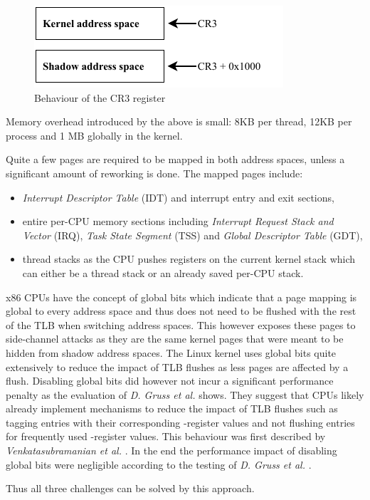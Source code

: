 \begin{figure}[h]
  \begin{center}
    \includegraphics[page=1,width=.35\textwidth]{fig/prebuilt_cr3-register}
  \end{center}
  \caption{Behaviour of the CR3 register}
  \label{fig:cr3-register}
\end{figure}

Memory overhead introduced by the above is small: 8KB per thread, 12KB per process and 1 MB globally in the kernel.\cite{kaiser}

Quite a few pages are required to be mapped in both address spaces, unless a significant amount of reworking is done.
The mapped pages include:

\begin{itemize}
  \item{\textit{Interrupt Descriptor Table} (IDT) and interrupt entry and exit  sections,}
  \item{entire per-CPU memory sections including \textit{Interrupt Request Stack and Vector} (IRQ), \textit{Task State Segment} (TSS) and \textit{Global Descriptor Table} (GDT),}
  \item{thread stacks as the CPU pushes registers on the current kernel stack which can either be a thread stack or an already saved per-CPU stack.}
\end{itemize}

x86 CPUs have the concept of global bits which indicate that a page mapping is global to every address space and thus does not need to be flushed with the rest of the TLB when switching address spaces.
This however exposes these pages to side-channel attacks as they are the same kernel pages that were meant to be hidden from shadow address spaces.
The Linux kernel uses global bits quite extensively to reduce the impact of TLB flushes as less pages are affected by a flush.
Disabling global bits did however not incur a significant performance penalty as the evaluation of \textit{D. Gruss et al.} \cite{kaiser} shows.
They suggest that CPUs likely already implement mechanisms to reduce the impact of TLB flushes such as tagging entries with their corresponding -register values and not flushing entries for frequently used -register values.
This behaviour was first described by \textit{Venkatasubramanian et al.} \cite{tlb-management-framework}.
In the end the performance impact of disabling global bits were negligible according to the testing of \textit{D. Gruss et al.} \cite{kaiser}.

Thus all three challenges can be solved by this approach.

